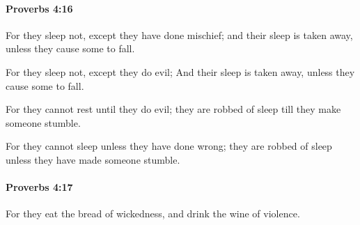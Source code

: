 		\paragraph{Proverbs 4:16} %
			\label{PROVERBS-4-16}

			For they sleep not, except they have done mischief; and their sleep is taken away, unless they cause some to fall.

			\begin{versebox}
					\item[BHS] 
					\item[ASV] For they sleep not, except they do evil; And their sleep is taken away, unless they cause some to fall.
					\item[NIV] For they cannot rest until they do evil; they are robbed of sleep till they make someone stumble.
					\item[NRSV] For they cannot sleep unless they have done wrong; they are robbed of sleep unless they have made someone stumble.
			\end{versebox}

		\paragraph{Proverbs 4:17} %
			\label{PROVERBS-4-17}

			For they eat the bread of wickedness, and drink the wine of violence.

